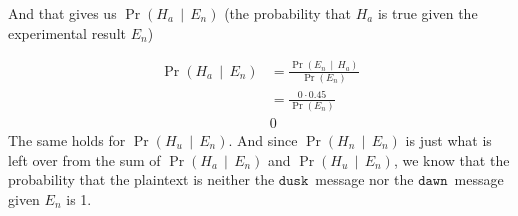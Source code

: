 \documentclass[11pt]{article}
\newcommand{\prob}[1]{\ensuremath{\operatorname{Pr}\left( #1 \right)}}
\newcommand{\condprob}[2]{\prob{#1\, \middle|\, #2}}
\newcommand\mdusk{\ensuremath{\mathtt{dusk}}}
\newcommand\mdawn{\ensuremath{\mathtt{dawn}}}
\begin{document}
And that gives us \condprob{H_a}{E_n} (the probability that $H_a$ is true given the experimental result $E_n$)

\begin{align*}
    \condprob{H_a}{E_n} &= \frac{\condprob{E_n}{H_a}}{\prob{E_n}} \\
                        &= \frac{0 \cdot 0.45}{\prob{E_n}} \\
                        & 0 
\end{align*}
The same holds for $\condprob{H_u}{E_n}$. And since $\condprob{H_n}{E_n}$ is just what is left over from the sum of  $\condprob{H_a}{E_n}$ and $\condprob{H_u}{E_n}$, we know that the probability that the plaintext is neither the \mdusk\ message nor the \mdawn\ message given $E_n$ is 1.
\end{document}
